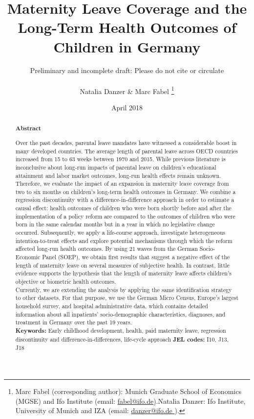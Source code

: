 \documentclass[a4paper ]{article}
\title{Maternity Leave Coverage and the Long-Term Health Outcomes of Children in Germany%
}
\author{{\color{red}Preliminary and incomplete draft: Please do not cite or circulate}\\ \\
Natalia Danzer \& Marc Fabel \thanks{Marc Fabel (corresponding author): Munich Graduate School of Economics (MGSE) and Ifo Institute (email: \href{mailto:fabel@ifo.de}{fabel@ifo.de}).\newline Natalia Danzer: Ifo Institute, University of Munich and IZA (email: \href{mailto:danzer@ifo.de }{danzer@ifo.de }).}}
\date{April 2018}
\renewcommand{\headrulewidth}{0.5pt}
\begin{document}
\thispagestyle{empty}\fancyhf{}
\rhead{}
\renewcommand{\headrulewidth}{0.5pt}



%

\newpage

\clearpage
\setcounter{page}{1}    
\rhead{\thepage}

        \newpage

\renewcommand{\abstractname}{\vspace{-\baselineskip}}	%
\maketitle
    \begin{abstract}\noindent 
   \footnotesize{\begin{center}\textbf{Abstract}\end{center}
   Over the past decades, parental leave mandates have witnessed a considerable boost in many developed countries. The average length of parental leave across OECD countries increased from 15 to 63 weeks between 1970 and 2015. While previous literature is inconclusive about long-run impacts of parental leave on children's educational attainment and labor market outcomes, long-run health effects remain unknown. Therefore, we evaluate the impact of an expansion in maternity leave coverage from two to six months on children's long-term health outcomes in Germany. We combine a regression discontinuity with a difference-in-difference approach in order to estimate a causal effect: health outcomes of children who were born shortly before and after the implementation of a policy reform are compared to the outcomes of children who were born in the same calendar months but in a year in which no legislative change occurred. Subsequently, we apply a life-course approach, investigate heterogeneous intention-to-treat effects and explore potential mechanisms through which the reform affected long-run health outcomes. By using 21 waves from the German Socio-Economic Panel (SOEP), we obtain first results that suggest a negative effect of the length of maternity leave on several measures of subjective health. In contrast, little evidence supports the hypothesis that the length of maternity leave affects children's objective or biometric health outcomes.\newline\\ {\color{red}Currently, we are extending the analysis by applying the same identification strategy to other datasets. For that purpose, we use the German Micro Census, Europe's largest household survey, and hospital administrative data, which contains detailed information about all inpatients' socio-demographic characteristics, diagnoses, and treatment in Germany over the past 19 years.} \\\newline \textbf{Keywords:} Early childhood development, health, paid maternity leave, regression discontinuity and difference-in-differences, life-cycle approach \newline \textbf{JEL codes:} I10, J13, J18}
    \end{abstract}
   
\end{document}
